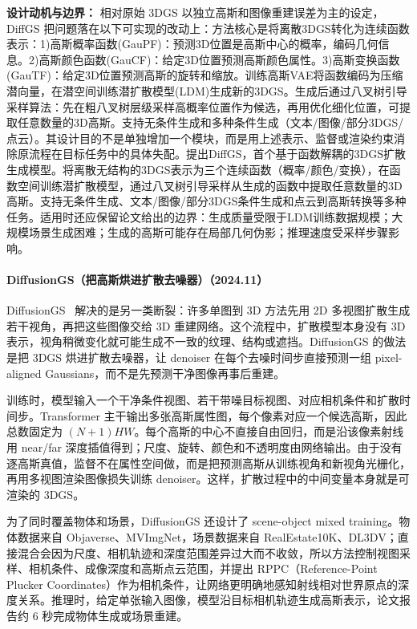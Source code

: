 \textbf{设计动机与边界：} 相对原始 3DGS 以独立高斯和图像重建误差为主的设定，DiffGS 把问题落在以下可实现的改动上：方法核心是将离散3DGS转化为连续函数表示：1)高斯概率函数(GauPF)：预测3D位置是高斯中心的概率，编码几何信息。2)高斯颜色函数(GauCF)：给定3D位置预测高斯颜色属性。3)高斯变换函数(GauTF)：给定3D位置预测高斯的旋转和缩放。训练高斯VAE将函数编码为压缩潜向量，在潜空间训练潜扩散模型(LDM)生成新的3DGS。生成后通过八叉树引导采样算法：先在粗八叉树层级采样高概率位置作为候选，再用优化细化位置，可提取任意数量的3D高斯。支持无条件生成和多种条件生成（文本/图像/部分3DGS/点云）。其设计目的不是单独增加一个模块，而是用上述表示、监督或渲染约束消除原流程在目标任务中的具体失配。提出DiffGS，首个基于函数解耦的3DGS扩散生成模型。将离散无结构的3DGS表示为三个连续函数（概率/颜色/变换），在函数空间训练潜扩散模型，通过八叉树引导采样从生成的函数中提取任意数量的3D高斯。支持无条件生成、文本/图像/部分3DGS条件生成和点云到高斯转换等多种任务。适用时还应保留论文给出的边界：生成质量受限于LDM训练数据规模；大规模场景生成困难；生成的高斯可能存在局部几何伪影；推理速度受采样步骤影响。
\paragraph{DiffusionGS（把高斯烘进扩散去噪器）（2024.11）}
DiffusionGS~\cite{2411_14384} 解决的是另一类断裂：许多单图到 3D 方法先用 2D 多视图扩散生成若干视角，再把这些图像交给 3D 重建网络。这个流程中，扩散模型本身没有 3D 表示，视角稍微变化就可能生成不一致的纹理、结构或遮挡。DiffusionGS 的做法是把 3DGS 烘进扩散去噪器，让 denoiser 在每个去噪时间步直接预测一组 pixel-aligned Gaussians，而不是先预测干净图像再事后重建。

训练时，模型输入一个干净条件视图、若干带噪目标视图、对应相机条件和扩散时间步。Transformer 主干输出多张高斯属性图，每个像素对应一个候选高斯，因此总数固定为 $(N+1)HW$。每个高斯的中心不直接自由回归，而是沿该像素射线用 near/far 深度插值得到；尺度、旋转、颜色和不透明度由网络输出。由于没有逐高斯真值，监督不在属性空间做，而是把预测高斯从训练视角和新视角光栅化，再用多视图渲染图像损失训练 denoiser。这样，扩散过程中的中间变量本身就是可渲染的 3DGS。

为了同时覆盖物体和场景，DiffusionGS 还设计了 scene-object mixed training。物体数据来自 Objaverse、MVImgNet，场景数据来自 RealEstate10K、DL3DV；直接混合会因为尺度、相机轨迹和深度范围差异过大而不收敛，所以方法控制视图采样、相机条件、成像深度和高斯点云范围，并提出 RPPC（Reference-Point Plucker Coordinates）作为相机条件，让网络更明确地感知射线相对世界原点的深度关系。推理时，给定单张输入图像，模型沿目标相机轨迹生成高斯表示，论文报告约 6 秒完成物体生成或场景重建。

